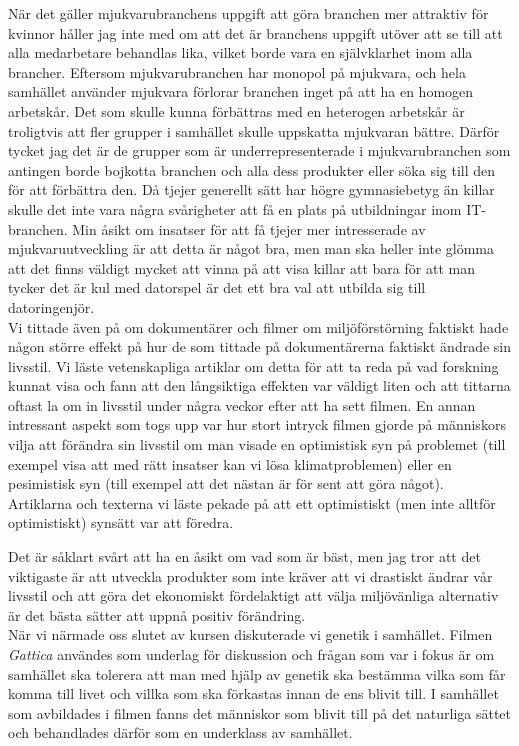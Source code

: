 \documentclass[12pt,a4paper]{article}
\begin{document}
När det gäller mjukvarubranchens uppgift att göra branchen mer attraktiv för kvinnor håller jag inte med om att det är branchens uppgift utöver att se till att alla medarbetare behandlas lika, vilket borde vara en självklarhet inom alla brancher.
Eftersom mjukvarubranchen har monopol på mjukvara, och hela samhället använder mjukvara förlorar branchen inget på att ha en homogen arbetskår.
Det som skulle kunna förbättras med en heterogen arbetskår är troligtvis att fler grupper i samhället skulle uppskatta mjukvaran bättre.
Därför tycket jag det är de grupper som är underrepresenterade i mjukvarubranchen som antingen borde bojkotta branchen och alla dess produkter eller söka sig till den för att förbättra den.
Då tjejer generellt sätt har högre gymnasiebetyg än killar skulle det inte vara några svårigheter att få en plats på utbildningar inom IT-branchen.
Min åsikt om insatser för att få tjejer mer intresserade av mjukvaruutveckling är att detta är något bra, men man ska heller inte glömma att det finns väldigt mycket att vinna på att visa killar att bara för att man tycker det är kul med datorspel är det ett bra val att utbilda sig till datoringenjör.\\

\noindent Vi tittade även på om dokumentärer och filmer om miljöförstörning faktiskt hade någon större effekt på hur de som tittade på dokumentärerna faktiskt ändrade sin livsstil.
Vi läste vetenskapliga artiklar om detta för att ta reda på vad forskning kunnat visa och fann att den långsiktiga effekten var väldigt liten och att tittarna oftast la om in livsstil under några veckor efter att ha sett filmen.
En annan intressant aspekt som togs upp var hur stort intryck filmen gjorde på människors vilja att förändra sin livsstil om man visade en optimistisk syn på problemet (till exempel visa att med rätt insatser kan vi lösa klimatproblemen) eller en pesimistisk syn (till exempel att det nästan är för sent att göra något).
Artiklarna och texterna vi läste pekade på att ett optimistiskt (men inte alltför optimistiskt) synsätt var att föredra.

Det är såklart svårt att ha en åsikt om vad som är bäst, men jag tror att det viktigaste är att utveckla produkter som inte kräver att vi drastiskt ändrar vår livsstil och att göra det ekonomiskt fördelaktigt att välja miljövänliga alternativ är det bästa sätter att uppnå positiv förändring.\\

\noindent När vi närmade oss slutet av kursen diskuterade vi genetik i samhället.
Filmen \textit{Gattica} användes som underlag för diskussion och frågan som var i fokus är om samhället ska tolerera att man med hjälp av genetik ska bestämma vilka som får komma till livet och villka som ska förkastas innan de ens blivit till.
I samhället som avbildades i filmen fanns det människor som blivit till på det naturliga sättet och behandlades därför som en underklass av samhället.
\end{document}
